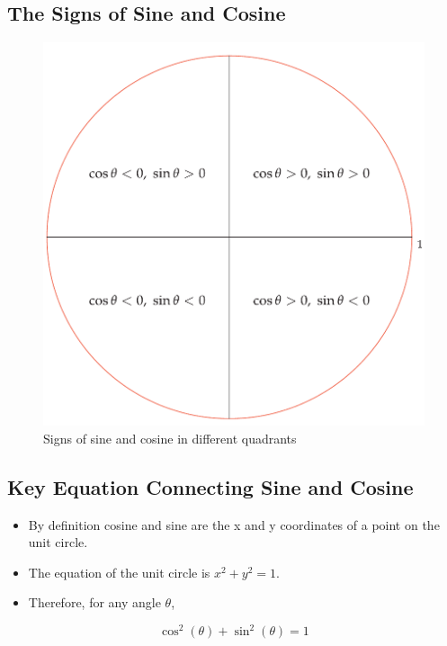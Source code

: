\subsection{The Signs of Sine and Cosine}
\begin{figure}
    \centering
    \includegraphics[scale=0.2]{pics/8.png}
    \caption{Signs of sine and cosine in different quadrants}
\end{figure}

\subsection{Key Equation Connecting Sine and Cosine}
\begin{itemize}
    \item By definition cosine and sine are the x and y coordinates of a point on the unit circle.
    \item The equation of the unit circle is $x^2 + y^2 = 1$.
    \item Therefore, for any angle $\theta$,
\end{itemize}
\[\cos^2(\theta) + \sin^2(\theta) = 1\]

